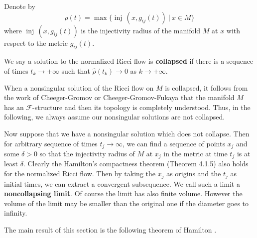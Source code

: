 Denote by
$$
\hat{\rho}(t)=\max\{\operatorname{inj}\,(x,g_{ij}(t))\ |\ x\in M \}
$$
where $\operatorname{inj}\,(x,g_{ij}(t))$ is the injectivity radius of the
manifold $M$ at $x$ with respect to the metric $g_{ij}(t)$.


\begin{definition}
  \label{def:cz-collapsed-nonsingular-solution}

We say a solution to the normalized Ricci flow is {\bf
collapsed} if there is a sequence of times
$t_k\rightarrow+\infty$ such that $\hat{\rho}(t_k)\rightarrow0$ as
$k\rightarrow+\infty$.
\end{definition}

When a nonsingular solution of the Ricci flow on $M$ is collapsed,
it follows from the work of Cheeger-Gromov \cite{ChG86, ChG90} or
Cheeger-Gromov-Fukaya \cite{CGF92} that the manifold $M$ has an
$\mathcal{F}$-structure and then its topology is completely
understood. Thus, in the following, we always assume our
nonsingular solutions are not collapsed.

Now suppose that we have a nonsingular solution which does not
collapse. Then for arbitrary sequence of times
$t_j\rightarrow\infty$, we can find a sequence of points $x_j$ and
some $\delta>0$ so that the injectivity radius of $M$ at $x_j$ in
the metric at time $t_j$ is at least $\delta$. Clearly the
Hamilton's compactness theorem (Theorem 4.1.5) also holds for the
normalized Ricci flow. Then by taking the $x_j$ as origins and the
$t_j$ as initial times, we can extract a convergent subsequence.
We call such a limit a {\bf noncollapsing
limit}. Of course the limit has also
finite volume. However the volume of the limit may be smaller than
the original one if the diameter goes to infinity.

The main result of this section is the following theorem of
Hamilton \cite{Ha99}.


